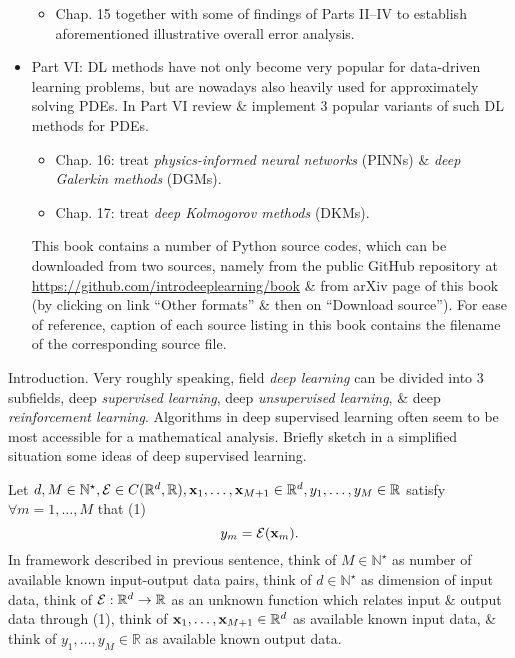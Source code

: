 \documentclass{article}
\begin{document}
\begin{itemize}
\begin{itemize}
		\item Chap. 15 together with some of findings of Parts II--IV to establish aforementioned illustrative overall error analysis.
	\end{itemize}
	\item Part VI: DL methods have not only become very popular for data-driven learning problems, but are nowadays also heavily used for approximately solving PDEs. In Part VI review \& implement 3 popular variants of such DL methods for PDEs.
	\begin{itemize}
		\item Chap. 16: treat {\it physics-informed neural networks} (PINNs) \& {\it deep Galerkin methods} (DGMs).
		\item Chap. 17: treat {\it deep Kolmogorov methods} (DKMs).
	\end{itemize}
	This book contains a number of Python source codes, which can be downloaded from two sources, namely from the public GitHub repository at \url{https://github.com/introdeeplearning/book} \& from arXiv page of this book (by clicking on link ``Other formats'' \& then on ``Download source''). For ease of reference, caption of each source listing in this book contains the filename of the corresponding source file.		
\end{itemize}

{\sf Introduction.} Very roughly speaking, field {\it deep learning} can be divided into 3 subfields, deep {\it supervised learning}, deep {\it unsupervised learning}, \& deep {\it reinforcement learning}. Algorithms in deep supervised learning often seem to be most accessible for a mathematical analysis. Briefly sketch in a simplified situation some ideas of deep supervised learning.

Let $d,M\in\mathbb{N}^\star,{\cal E}\in C(\mathbb{R}^d,\mathbb{R}),{\bf x}_1,\ldots,{\bf x}_{M+1}\in\mathbb{R}^d,y_1,\ldots,y_M\in\mathbb{R}$ satisfy $\forall m = 1,\ldots,M$ that (1)
\begin{equation}
	y_m = {\cal E}({\bf x}_m).
\end{equation}
In framework described in previous sentence, think of $M\in\mathbb{N}^\star$ as number of available known input-output data pairs, think of $d\in\mathbb{N}^\star$ as dimension of input data, think of ${\cal E}:\mathbb{R}^d\to\mathbb{R}$ as an unknown function which relates input \& output data through (1), think of ${\bf x}_1,\ldots,{\bf x}_{M+1}\in\mathbb{R}^d$ as available known input data, \& think of $y_1,\ldots,y_M\in\mathbb{R}$ as available known output data.
\end{document}
